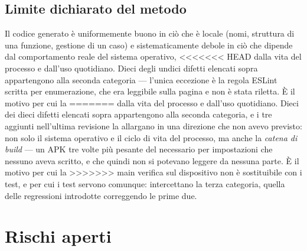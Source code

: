 \documentclass[11pt,a4paper]{report}
\begin{document}
\section{Limite dichiarato del metodo}

Il codice generato \`e uniformemente buono in ci\`o che \`e locale
(nomi, struttura di una funzione, gestione di un caso) e sistematicamente
debole in ci\`o che dipende dal comportamento reale del sistema operativo,
<<<<<<< HEAD
dalla vita del processo e dall'uso quotidiano. Dieci degli undici difetti
elencati sopra appartengono alla seconda categoria --- l'unica eccezione \`e la
regola ESLint scritta per enumerazione, che era leggibile sulla pagina e non
\`e stata riletta. \`E il motivo per cui la
=======
dalla vita del processo e dall'uso quotidiano. Dieci dei dieci difetti
elencati sopra appartengono alla seconda categoria, e i tre aggiunti
nell'ultima revisione la allargano in una direzione che non avevo previsto: non
solo il sistema operativo e il ciclo di vita del processo, ma anche la
\emph{catena di build} --- un APK tre volte pi\`u pesante del necessario per
impostazioni che nessuno aveva scritto, e che quindi non si potevano leggere da
nessuna parte. \`E il motivo per cui la
>>>>>>> main
verifica sul dispositivo non \`e sostituibile con i test, e per cui i test
servono comunque: intercettano la terza categoria, quella delle regressioni
introdotte correggendo le prime due.

\chapter{Rischi aperti}
\end{document}
